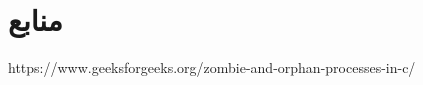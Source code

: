 \documentclass{article}
\begin{document}
\section*{منابع}
\renewcommand{\section}[2]{}%
\begin{thebibliography}{99} %


\begin{LTRitems}

\resetlatinfont

https://www.geeksforgeeks.org/zombie-and-orphan-processes-in-c/

\end{LTRitems}

\end{thebibliography}
\end{document}
